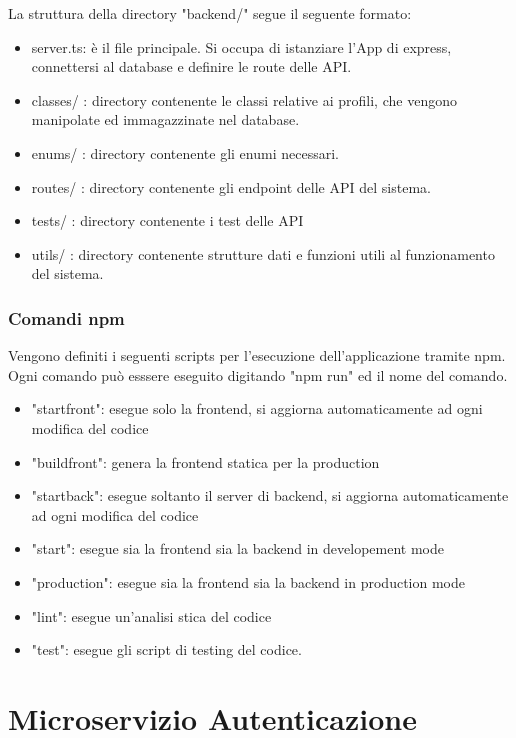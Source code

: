 \documentclass{report}
\begin{document}
La struttura della directory "backend/" segue il seguente formato:
\begin{itemize}
	\item server.ts: è il file principale. Si occupa di istanziare l'App di express, 
	connettersi al database e definire le route delle API.
	\item classes/ : directory contenente le classi relative ai profili, che vengono manipolate ed immagazzinate nel database.
	\item enums/ : directory contenente gli enumi necessari.
	\item routes/ : directory contenente gli endpoint delle API del sistema.
	\item tests/ : directory contenente i test delle API
	\item utils/ : directory contenente strutture dati e funzioni utili al funzionamento del sistema.
\end{itemize} 

\subsection{Comandi npm}
Vengono definiti i seguenti scripts per l'esecuzione dell'applicazione tramite npm. Ogni comando può esssere eseguito digitando "npm run" ed il nome del comando.
\begin{itemize}
	\item "startfront": esegue solo la frontend, si aggiorna automaticamente ad ogni modifica del codice
	\item "buildfront": genera la frontend statica per la production
	\item "startback": esegue soltanto il server di backend, si aggiorna automaticamente ad ogni modifica del codice
	\item "start": esegue sia la frontend sia la backend in developement mode
	\item "production": esegue sia la frontend sia la backend in production mode
	\item "lint": esegue un'analisi stica del codice
	\item "test": esegue gli script di testing del codice.
\end{itemize}
	
	
	
	

\chapter{Microservizio Autenticazione}
\end{document}
